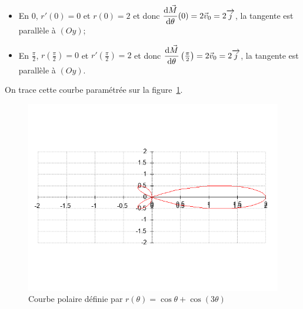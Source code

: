 \begin{itemize}
\item En $0$, $r'(0)=0$ et $r(0)=2$ et donc $\dfrac{\mathrm{d} \vec{M}}{\mathrm{d} \theta}(0)=2 \vec{v}_0=2 \overrightarrow{j}$, la tangente est parallèle à $(Oy)$;
\item En $\frac{\pi}{2}$, $r\left(\frac{\pi}{2}\right)=0$ et $r'\left(\frac{\pi}{2}\right)=2$ et donc $\dfrac{\mathrm{d} \vec{M}}{\mathrm{d} \theta}\left(\frac{\pi}{2}\right)=2 \vec{v}_0=2 \overrightarrow{j}$, la tangente est parallèle à $(Oy)$.
\end{itemize}
On trace cette courbe paramétrée sur la figure~\ref{fig:pol}.
\begin{figure}
 \centering
 \includegraphics[angle=-90,width=\textwidth,scale=1]{courbepolaire.png}
 \caption{Courbe polaire définie par $r(\theta)=\cos\theta+\cos(3\theta)$}
 \label{fig:pol}
\end{figure}

